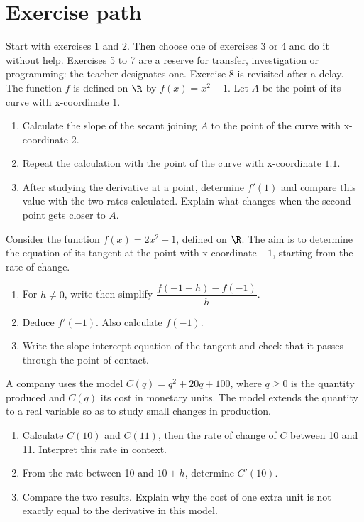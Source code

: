 \section*{Exercise path}\label{C04-PARC}
Start with exercises 1 and 2. Then choose one of exercises 3 or 4 and do it without help. Exercises 5 to 7 are a reserve for transfer, investigation or programming: the teacher designates one. Exercise 8 is revisited after a delay.
\begingroup
{}
The function $f$ is defined on $\R$ by $f(x)=x^2-1$. Let $A$ be the point of its curve with x-coordinate 1.
\begin{enumerate}[label=\arabic*.]
\item Calculate the slope of the secant joining $A$ to the point of the curve with x-coordinate 2.
\item Repeat the calculation with the point of the curve with x-coordinate $\num{1,1}$.
\item After studying the derivative at a point, determine $f\prime(1)$ and compare this value with the two rates calculated. Explain what changes when the second point gets closer to $A$.
\end{enumerate}
Consider the function $f(x)=2x^2+1$, defined on $\R$. The aim is to determine the equation of its tangent at the point with x-coordinate $-1$, starting from the rate of change.
\begin{enumerate}[label=\arabic*.]
\item For $h\ne0$, write then simplify $\dfrac{f(-1+h)-f(-1)}{h}$.
\item Deduce $f\prime(-1)$. Also calculate $f(-1)$.
\item Write the slope-intercept equation of the tangent and check that it passes through the point of contact.
\end{enumerate}
A company uses the model $C(q)=q^2+20q+100$, where $q\geq0$ is the quantity produced and $C(q)$ its cost in monetary units. The model extends the quantity to a real variable so as to study small changes in production.
\begin{enumerate}[label=\arabic*.]
\item Calculate $C(10)$ and $C(11)$, then the rate of change of $C$ between 10 and 11. Interpret this rate in context.
\item From the rate between 10 and $10+h$, determine $C\prime(10)$.
\item Compare the two results. Explain why the cost of one extra unit is not exactly equal to the derivative in this model.
\end{enumerate}
